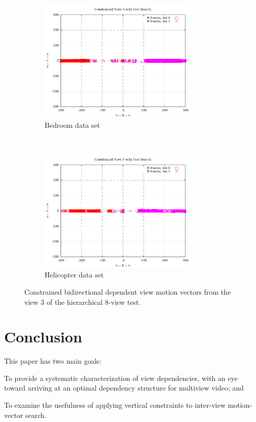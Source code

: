 \documentclass{sig-alternate-05-2015}
\begin{document}
\begin{figure}[H]
\centering
\begin{subfigure}{.5\textwidth}
\centering
\includegraphics[width=3in]{figures/bedroom1-inter-view-constrained-bimvs1.pdf}
\caption{Bedroom data set}
\label{fig:bedroom-inter-view-constrained-bimvs1}
\end{subfigure} \\
\begin{subfigure}{.5\textwidth}
\centering
\includegraphics[width=3in]{figures/helicopter-inter-view-constrained-bimvs1.pdf}
\caption{Helicopter data set}
\label{fig:helicopter-inter-view-constrained-bimvs1}
\end{subfigure}
\caption{Constrained bidirectional dependent view motion vectors from the view 3
of the hierarchical 8-view test.}
\label{fig:inter-view-constrained-bimvs1}
\end{figure}
   
\section{Conclusion} %
\label{sec:conclusion} %
This paper has two main goals: \begin{compactenum}
\item \label{itm:fst} To provide a systematic characterization of view
dependencies, with an eye toward arriving at an optimal dependency structure for
multiview video; and
\item \label{itm:snd} To examine the usefulness of applying vertical constraints
to inter-view motion-vector search. \end{compactenum}
\end{document}
